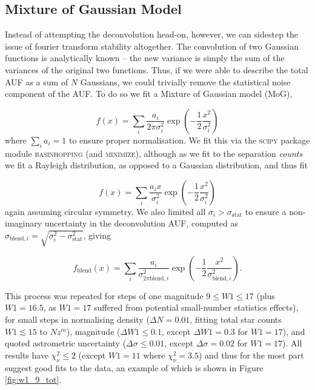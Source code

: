 \documentclass[fleqn,usenatbib]{mnras}
\begin{document}
\subsection{Mixture of Gaussian Model}
Instead of attempting the deconvolution head-on, however, we can sidestep the issue of fourier transform stability altogether. The convolution of two Gaussian functions is analytically known -- the new variance is simply the sum of the variances of the original two functions. Thus, if we were able to describe the total AUF as a sum of $N$ Gaussians, we could trivially remove the statistical noise component of the AUF. To do so we fit a Mixture of Gaussian model (MoG),

\begin{equation}
	f(x) = \sum\limits_i \frac{a_i}{2 \pi \sigma_i^2} \exp{\left(-\frac{1}{2}\frac{x^2}{\sigma_i^2}\right)}
\end{equation}
where $\sum_i a_i = 1$ to ensure proper normalisation. We fit this via the \textsc{scipy} package module \textsc{basinhopping} (and \textsc{minimize}), although as we fit to the separation \textit{counts} we fit a Rayleigh distribution, as opposed to a Gaussian distribution, and thus fit

\begin{equation}
	f(x) = \sum\limits_i \frac{a_i x}{\sigma_i^2} \exp{\left(-\frac{1}{2}\frac{x^2}{\sigma_i^2}\right)}
\end{equation}
again assuming circular symmetry. We also limited all $\sigma_i > \sigma_\mathrm{stat}$ to ensure a non-imaginary uncertainty in the deconvolution AUF, computed as $\sigma_{\mathrm{blend}, i} = \sqrt{\sigma_i^2 - \sigma_\mathrm{stat}^2}$, giving

\begin{equation}
	f_\mathrm{blend}(x) = \sum\limits_i \frac{a_i}{\sigma_{2 \pi \mathrm{blend}, i}^2} \exp{\left(-\frac{1}{2}\frac{x^2}{\sigma_{\mathrm{blend}, i}^2}\right)}.
\end{equation}

This process was repeated for steps of one magnitude $9 \leq W1 \leq 17$ (plus $W1=16.5$, as $W1=17$ suffered from potential small-number statistics effects), for small steps in normalising density ($\Delta N=0.01$, fitting total star counts $W1\lesssim15$ to $N z^m$), magnitude ($\Delta W1 \leq 0.1$, except $\Delta W1=0.3$ for $W1=17$), and quoted astrometric uncertainty ($\Delta \sigma \leq 0.01$, except $\Delta \sigma=0.02$ for $W1=17$). All results have $\chi_\nu^2 \leq 2$ (except $W1=11$ where $\chi_\nu^2 = 3.5$) and thus for the most part suggest good fits to the data, an example of which is shown in Figure \ref{fig:w1_9_tot}.
\end{document}
